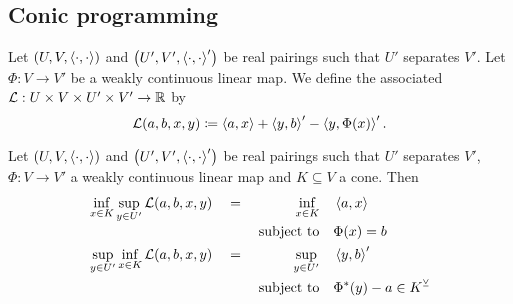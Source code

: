 \subsection{Conic programming}
\begin{definition}
Let $\sSet{U,V,\pair{\cdot,\cdot}}$ and $\sSet{U',V',\pair{\cdot,\cdot}'}$ be real pairings such that $U'$ separates $V'$. Let $\Phi: V\to V'$ be a weakly continuous linear map. We define the associated  $\mathcal{L}: U\times V\times U'\times V'\to \mathbb{R}$ by
\[ \mathcal{L}(a,b,x,y) \coloneqq \left\langle a,x \right\rangle + \left\langle y,b \right\rangle' - \left\langle y,\Phi(x) \right\rangle'. \]
\end{definition}

\begin{lemma} \label{weakDualityLemma}
Let $\sSet{U,V,\pair{\cdot,\cdot}}$ and $\sSet{U',V',\pair{\cdot,\cdot}'}$ be real pairings such that $U'$ separates $V'$, $\Phi: V\to V'$ a weakly continuous linear map and $K\subseteq V$ a cone. Then
\begin{align*}
\inf_{x\in K}\sup_{y\in U'} \mathcal{L}(a,b,x,y) \quad&=\quad \begin{aligned}[t]
\inf_{x\in K} \quad & \left\langle a,x \right\rangle \\
\text{subject to} \quad & \Phi(x) = b
\end{aligned} \\
\sup_{y\in U'}\inf_{x\in K} \mathcal{L}(a,b,x,y) \quad&=\quad \begin{aligned}[t]
\sup_{y\in U'} \quad & \left\langle y,b \right\rangle' \\
\text{subject to} \quad & \Phi^*(y) - a \in K^\veebar
\end{aligned}
\end{align*}
\end{lemma}
